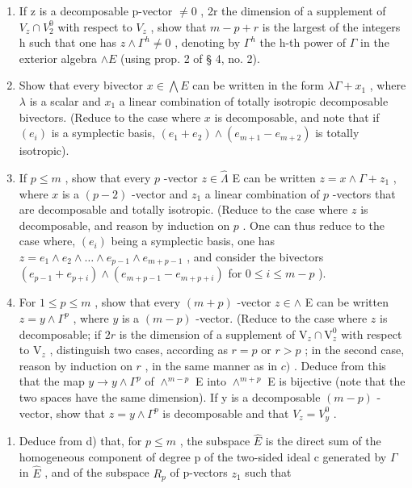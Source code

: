 \begin{enumerate}
\def\labelenumi{\alph{enumi})}
\item
  If z is a decomposable p-vector \(\neq0\) , 2r the dimension of a supplement of \(V_{z}\cap V_{2}^{0}\) with respect to \(V_{z}\) , show that \(m-p+r\) is the largest of the integers h such that one has \(z\wedge\Gamma^{h}\neq0\) , denoting by \(\Gamma^{h}\) the h-th power of \(\Gamma\) in the exterior algebra \(\wedge E\) (using prop. 2 of § 4, no. 2).
\item
  Show that every bivector \(x \in \bigwedge E\) can be written in the form \(\lambda \Gamma + x_{1}\) , where \(\lambda\) is a scalar and \(x_{1}\) a linear combination of totally isotropic decomposable bivectors. (Reduce to the case where \(x\) is decomposable, and note that if \((e_{i})\) is a symplectic basis, \((e_{1} + e_{2}) \wedge (e_{m+1} - e_{m+2})\) is totally isotropic).
\item
  If \(p \leqslant m\) , show that every \(p\) -vector \(z \in \hat{\Lambda}\) E can be written \(z = x \wedge \Gamma + z_1\) , where \(x\) is a \((p - 2)\) -vector and \(z_1\) a linear combination of \(p\) -vectors that are decomposable and totally isotropic. (Reduce to the case where \(z\) is decomposable, and reason by induction on \(p\) . One can thus reduce to the case where, \((e_i)\) being a symplectic basis, one has \(z = e_1 \wedge e_2 \wedge \ldots \wedge e_{p-1} \wedge e_{m+p-1}\) , and consider the bivectors \((e_{p-1} + e_{p+i}) \wedge (e_{m+p-1} - e_{m+p+i})\) for \(0 \leqslant i \leqslant m - p\) ).
\item
  For \(1 \leqslant p \leqslant m\) , show that every \((m+p)\) -vector \(z \in \wedge\) E can be written \(z = y \wedge \Gamma^p\) , where \(y\) is a \((m-p)\) -vector. (Reduce to the case where \(z\) is decomposable; if \(2r\) is the dimension of a supplement of \(\mathrm{V}_z \cap \mathrm{V}_z^0\) with respect to \(\mathrm{V}_z\) , distinguish two cases, according as \(r = p\) or \(r > p\) ; in the second case, reason by induction on \(r\) , in the same manner as in \(c)\) . Deduce from this that the map \(y \to y \wedge \Gamma^p\) of \(\wedge^{m-p}\) E into \(\wedge^{m+p}\) E is bijective (note that the two spaces have the same dimension). If y is a decomposable \((m-p)\) -vector, show that \(z = y \wedge \Gamma^{p}\) is decomposable and that \(V_{z} = V_{y}^{0}\) .
\end{enumerate}

\begin{enumerate}
\def\labelenumi{\alph{enumi})}
\setcounter{enumi}{4}
\tightlist
\item
  Deduce from d) that, for \(p \leqslant m\) , the subspace \(\hat{E}\) is the direct sum of the homogeneous component of degree p of the two-sided ideal c generated by \(\Gamma\) in \(\hat{E}\) , and of the subspace \(R_{p}\) of p-vectors \(z_{1}\) such that
\end{enumerate}

